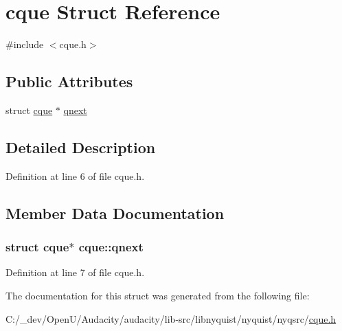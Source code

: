 \hypertarget{structcque}{}\section{cque Struct Reference}
\label{structcque}


{\ttfamily \#include $<$cque.\+h$>$}

\subsection*{Public Attributes}
\begin{DoxyCompactItemize}
\item 
struct \hyperlink{structcque}{cque} $\ast$ \hyperlink{structcque_a57f045c1684a63180f84e5726ddc4afe}{qnext}
\end{DoxyCompactItemize}


\subsection{Detailed Description}


Definition at line 6 of file cque.\+h.



\subsection{Member Data Documentation}
\subsubsection[{\texorpdfstring{qnext}{qnext}}]{\setlength{\rightskip}{0pt plus 5cm}struct {\bf cque}$\ast$ cque\+::qnext}\hypertarget{structcque_a57f045c1684a63180f84e5726ddc4afe}{}\label{structcque_a57f045c1684a63180f84e5726ddc4afe}


Definition at line 7 of file cque.\+h.



The documentation for this struct was generated from the following file\+:\begin{DoxyCompactItemize}
\item 
C\+:/\+\_\+dev/\+Open\+U/\+Audacity/audacity/lib-\/src/libnyquist/nyquist/nyqsrc/\hyperlink{cque_8h}{cque.\+h}\end{DoxyCompactItemize}
